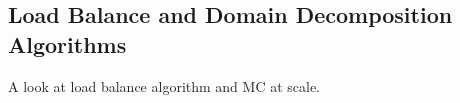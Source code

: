 \subsection{Load Balance and Domain Decomposition Algorithms}

A look at load balance algorithm and MC at scale.